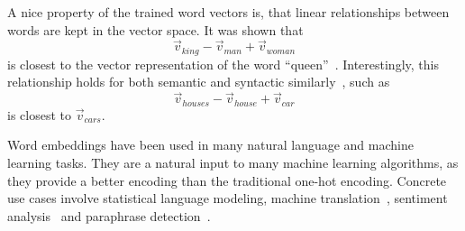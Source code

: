 \documentclass[
        a4paper,
        titlepage,
        twoside,
        parskip,
        numbers=noenddot
        ]{scrbook}
\theoremstyle{break}
\begin{document}
A nice property of the trained word vectors is, that linear relationships between words are kept in the vector space.
It was shown that
\begin{equation*}
  \vec{v}_{king} - \vec{v}_{man} + \vec{v}_{woman}
\end{equation*}
is closest to the vector representation of the word ``queen''~\cite{Mikolov2013b}.
Interestingly, this relationship holds for both semantic and syntactic similarly~\cite{Mikolov2013a}, such as
\begin{equation*}
  \vec{v}_{houses} - \vec{v}_{house} + \vec{v}_{car}
\end{equation*}
is closest to $\vec{v}_{cars}$.

Word embeddings have been used in many natural language and machine learning tasks.
They are a natural input to many machine learning algorithms, as they provide a better encoding than the traditional one-hot encoding.
Concrete use cases involve statistical language modeling, machine translation~\cite{Zou2013}, sentiment analysis~\cite{Maas2011} and paraphrase detection~\cite{Mikolov2013a}.


\end{document}
